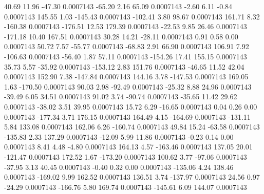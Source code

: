        40.69       11.96      -47.30     0.0007143
      -65.20        2.16       65.09     0.0007143
       -2.60        6.11       -0.84     0.0007143
      145.55        1.03     -145.43     0.0007143
     -102.41        3.80       98.67     0.0007143
      161.71        8.32     -160.38     0.0007143
     -176.51       12.53      179.39     0.0007143
      -22.53        9.85       26.46     0.0007143
     -171.18       10.40      167.51     0.0007143
       30.28       14.21      -28.11     0.0007143
        0.91        0.58        0.00     0.0007143
       50.72        7.57      -55.77     0.0007143
      -68.83        2.91       66.90     0.0007143
      106.91        7.92     -106.63     0.0007143
      -56.40        1.87       57.11     0.0007143
     -154.26       17.41      155.15     0.0007143
       35.73        5.57      -35.92     0.0007143
     -153.12        2.83      151.76     0.0007143
      -46.65       11.52       42.04     0.0007143
      152.90        7.38     -147.84     0.0007143
      144.16        3.78     -147.53     0.0007143
      169.05        1.63     -170.50     0.0007143
       90.03        2.98      -92.49     0.0007143
      -25.32        8.88       24.96     0.0007143
      -39.49        6.05       34.51     0.0007143
       91.02        3.74      -90.74     0.0007143
      -35.65       11.42       29.62     0.0007143
      -38.02        3.51       39.95     0.0007143
       15.72        6.29      -16.65     0.0007143
        0.04        0.26        0.00     0.0007143
     -177.34        3.71      176.15     0.0007143
      164.49        4.15     -164.69     0.0007143
     -131.11        5.84      133.08     0.0007143
      162.06        6.26     -160.74     0.0007143
       49.84       15.24      -63.58     0.0007143
     -135.83        2.33      137.29     0.0007143
      -12.09        5.99       11.86     0.0007143
       -0.23        0.14        0.00     0.0007143
        8.41        4.48       -4.80     0.0007143
      164.13        4.57     -163.46     0.0007143
      137.05       20.01     -121.47     0.0007143
      172.52        1.67     -173.20     0.0007143
      100.62        3.77      -97.06     0.0007143
      -37.95        3.13       40.45     0.0007143
       -0.40        0.32        0.00     0.0007143
     -135.06        4.24      138.46     0.0007143
     -169.02        9.99      162.52     0.0007143
      136.51        3.74     -137.97     0.0007143
       24.56        0.97      -24.29     0.0007143
     -166.76        5.80      169.74     0.0007143
     -145.61        6.09      144.07     0.0007143
